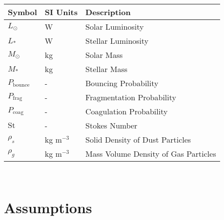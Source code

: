     \begin{table}[h!]
        \begin{tabular}{|l|l|l|}
            \hline
            \textbf{Symbol}     & \textbf{SI Units}     & \textbf{Description}
            \\ \hline
            $L_\odot$           & W                     & Solar Luminosity 
            \\ \hline
            $L_*$               & W                     & Stellar Luminosity 
            \\ \hline
            $M_\odot$           & kg                    & Solar Mass 
            \\ \hline
            $M_*$               & kg                    & Stellar Mass 
            \\ \hline
            $P_\text{bounce}$   & -                     & Bouncing Probability
            \\ \hline
            $P_\text{frag}$     & -                     & Fragmentation Probability
            \\ \hline
            $P_\text{coag}$     & -                     & Coagulation Probability
            \\ \hline
            $\text{St}$         & -                     & Stokes Number 
            \\ \hline
            $\rho_s$            & kg m$^{-3}$           & Solid Density of Dust Particles 
            \\ \hline
            $\rho_g$            & kg m$^{-3}$           & Mass Volume Density of Gas Particles 
            \\ \hline
        \end{tabular}
    \end{table} \ \\ 
    
\section{Assumptions}

